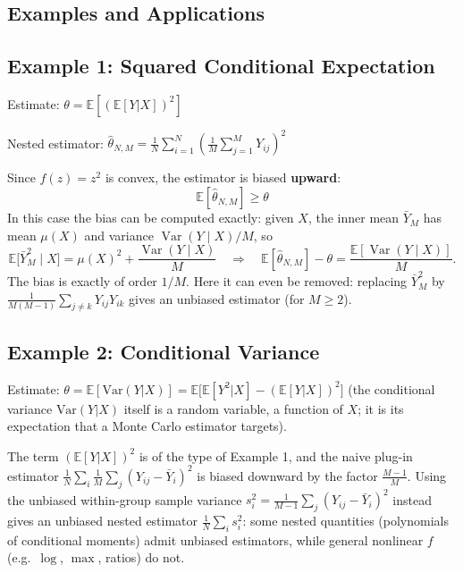 \begin{notechapter}
\section{Examples and Applications}

\subsection{Example 1: Squared Conditional Expectation}

Estimate: $\theta = \mathbb{E}[(\mathbb{E}[Y|X])^2]$

Nested estimator: $\hat{\theta}_{N,M} = \frac{1}{N} \sum_{i=1}^N \left(\frac{1}{M} \sum_{j=1}^M Y_{ij}\right)^2$

Since $f(z) = z^2$ is convex, the estimator is biased \textbf{upward}:
\begin{equation}
\mathbb{E}[\hat{\theta}_{N,M}] \geq \theta
\end{equation}
In this case the bias can be computed exactly: given $X$, the inner mean $\bar{Y}_M$ has mean
$\mu(X)$ and variance $\operatorname{Var}(Y\mid X)/M$, so
\[
\mathbb{E}\big[\bar{Y}_M^2 \mid X\big] = \mu(X)^2 + \frac{\operatorname{Var}(Y\mid X)}{M}
\quad\Longrightarrow\quad
\mathbb{E}[\hat{\theta}_{N,M}] - \theta = \frac{\mathbb{E}[\operatorname{Var}(Y\mid X)]}{M}.
\]
The bias is exactly of order $1/M$. Here it can even be removed: replacing $\bar{Y}_M^2$ by
$\frac{1}{M(M-1)}\sum_{j \neq k} Y_{ij}Y_{ik}$ gives an unbiased estimator (for $M \geq 2$).

\subsection{Example 2: Conditional Variance}

Estimate: $\theta = \mathbb{E}[\text{Var}(Y|X)] = \mathbb{E}\big[\mathbb{E}[Y^2|X] - (\mathbb{E}[Y|X])^2\big]$
(the conditional variance $\text{Var}(Y|X)$ itself is a random variable, a function of $X$; it is its
expectation that a Monte Carlo estimator targets).

The term $(\mathbb{E}[Y|X])^2$ is of the type of Example 1, and the naive plug-in estimator
$\frac{1}{N}\sum_i \frac{1}{M}\sum_j (Y_{ij} - \bar{Y}_{i})^2$ is biased downward by the factor $\frac{M-1}{M}$.
Using the unbiased within-group sample variance
$s_i^2 = \frac{1}{M-1}\sum_j (Y_{ij} - \bar{Y}_{i})^2$ instead gives an unbiased nested estimator
$\frac{1}{N}\sum_i s_i^2$: some nested quantities (polynomials of conditional moments) admit unbiased
estimators, while general nonlinear $f$ (e.g.\ $\log$, $\max$, ratios) do not.


\end{notechapter}
